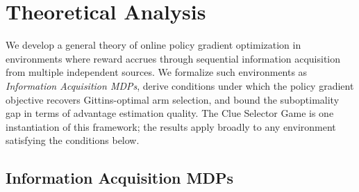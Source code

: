 \documentclass[11pt]{article}
\theoremstyle{plain}
\theoremstyle{definition}
\theoremstyle{remark}
\begin{document}




\iffalse

\section{Theoretical Analysis}
\label{sec:theory}






We develop a general theory of online policy gradient optimization 
in environments where reward accrues through sequential information 
acquisition from multiple independent sources. We formalize such 
environments as \emph{Information Acquisition MDPs}, derive conditions 
under which the policy gradient objective recovers Gittins-optimal 
arm selection, and bound the suboptimality gap in terms of advantage 
estimation quality. The Clue Selector Game is one instantiation of 
this framework; the results apply broadly to any environment 
satisfying the conditions below.

\subsection{Information Acquisition MDPs}
\end{document}
